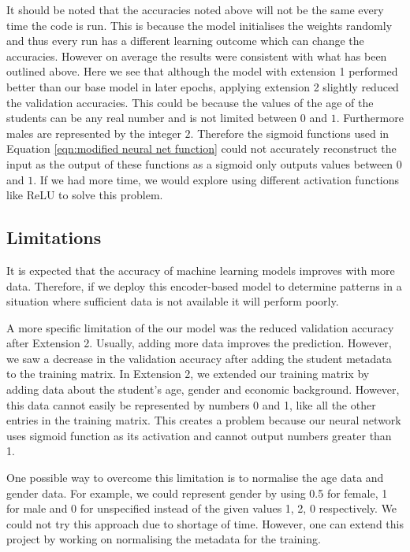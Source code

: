 \documentclass{article}
\begin{document}
It should be noted that the accuracies noted above will not be the same every time the code is run. This is because the model initialises the weights randomly and thus every run has a different learning outcome which can change the accuracies. However on average the results were consistent with what has been outlined above. Here we see that although the model with extension 1 performed better than our base model in later epochs, applying extension 2 slightly reduced the validation accuracies. This could be because the values of the age of the students can be any real number and is not limited between $0$ and $1$. Furthermore males are represented by the integer $2$. Therefore the sigmoid functions used in Equation \ref{eqn:modified neural net function} could not accurately reconstruct the input as the output of these functions as a sigmoid only outputs values between $0$ and $1$. If we had more time, we would explore using different activation functions like ReLU to solve this problem.

\subsection*{Limitations}
It is expected that the accuracy of machine learning models improves with more data. Therefore, if we deploy this encoder-based model to determine patterns in a situation where sufficient data is not available it will perform poorly. 

A more specific limitation of the our model was the reduced validation accuracy after Extension 2. Usually, adding more data improves the prediction. However, we saw a decrease in the validation accuracy after adding the student metadata to the training matrix. In Extension 2, we extended our training matrix by adding data about the student's age, gender and economic background. However, this data cannot easily be represented by numbers 0 and 1, like all the other entries in the training matrix. This creates a problem because our neural network uses sigmoid function as its activation and cannot output numbers greater than 1. 

One possible way to overcome this limitation is to normalise the age data and gender data. For example, we could represent gender by using 0.5 for female, 1 for male and 0 for unspecified instead of the given values 1, 2, 0 respectively. We could not try this approach due to shortage of time. However, one can extend this project by working on normalising the metadata for the training. 
\end{document}

